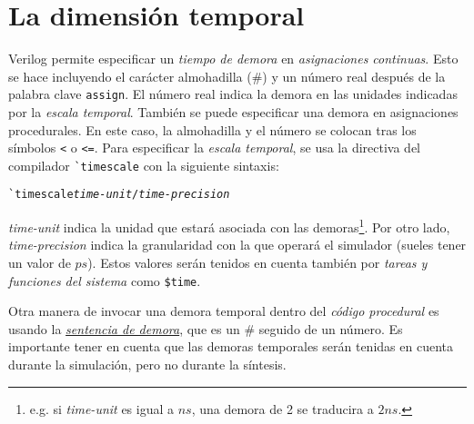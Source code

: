 \section{La dimensión temporal}
Verilog permite especificar un \emph{tiempo de demora} en \emph{asignaciones continuas}. Esto se hace incluyendo el carácter almohadilla (\#) y un número real después de la palabra clave \verb|assign|. El número real indica la demora en las unidades indicadas por la \emph{escala temporal}. También se puede especificar una demora en asignaciones procedurales. En este caso, la almohadilla y el número se colocan tras los símbolos \verb|<| o \verb|<=|. Para especificar la \emph{escala temporal}, se usa la directiva del compilador \verb|`timescale| con la siguiente sintaxis:

\begin{alltt}
\texttt{\`}timescale \emph{time-unit} / \emph{time-precision}
\end{alltt}

\emph{time-unit} indica la unidad que estará asociada con las demoras\footnote{e.g. si \emph{time-unit} es igual a $ns$, una demora de 2 se traducira a $2ns$.}. Por otro lado, \emph{time-precision} indica la granularidad con la que operará el simulador (sueles tener un valor de $ps$).
Estos valores serán tenidos en cuenta también por \emph{tareas y funciones del sistema} como \verb|$time|.

Otra manera de invocar una demora temporal dentro del \emph{código procedural} es usando la \hyperlink{delay_statement}{\emph{sentencia de demora}}, que es un \# seguido de un número. Es importante tener en cuenta que las demoras temporales serán tenidas en cuenta durante la simulación, pero no durante la síntesis. 